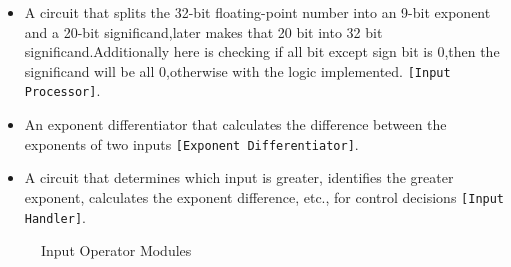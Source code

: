 \documentclass[a4paper,12pt]{article}
\begin{document}
\begin{itemize}

    \item A circuit that splits the 32-bit floating-point number into an 9-bit exponent and a 20-bit significand,later makes that 20 bit into 32 bit significand.Additionally here is checking if all bit except sign bit is 0,then the significand will be all 0,otherwise with the logic implemented. \texttt{[Input Processor]}.
    \item An exponent differentiator that calculates the difference between the exponents of two inputs \texttt{[Exponent Differentiator]}.
    \item A circuit that determines which input is greater, identifies the greater exponent, calculates the exponent difference, etc., for control decisions \texttt{[Input Handler]}.
\end{itemize}

\begin{figure}[H]
    \centering
    
    \hspace{1cm}
    \hspace{1cm}
    \caption{Input Operator Modules}
    \label{fig:input_operator}
\end{figure}
\end{document}
